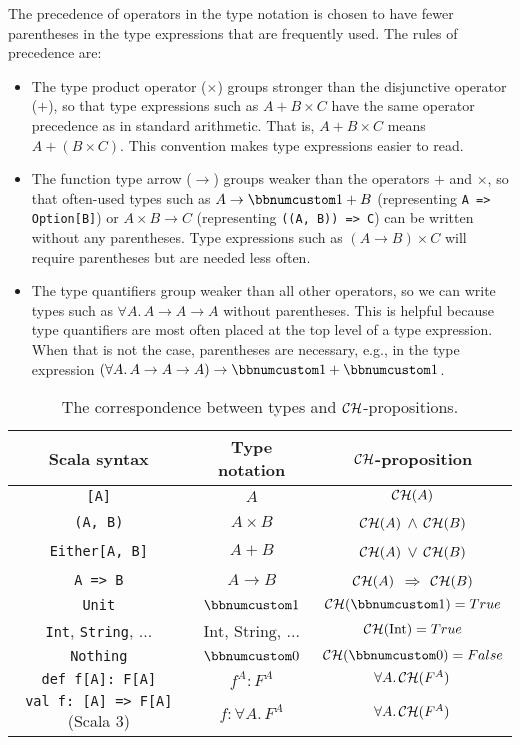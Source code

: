 The precedence of operators
in the type notation is chosen to have fewer parentheses in the type
expressions that are frequently used. The rules of precedence are:
\begin{itemize}
\item The type product operator ($\times$) groups stronger than the disjunctive
operator ($+$), so that type expressions such as $A+B\times C$ have
the same operator precedence as in standard arithmetic. That is, $A+B\times C$
means $A+\left(B\times C\right)$. This convention makes type expressions
easier to read.
\item The function type arrow ($\rightarrow$) groups weaker than the operators
$+$ and $\times$, so that often-used types such as $A\rightarrow\bbnum 1+B$
(representing \lstinline!A => Option[B]!) or $A\times B\rightarrow C$
(representing \lstinline!((A, B)) => C!) can be written without any
parentheses. Type expressions such as $\left(A\rightarrow B\right)\times C$
will require parentheses but are needed less often.
\item The type quantifiers group weaker than all other operators, so we
can write types such as $\forall A.\,A\rightarrow A\rightarrow A$
without parentheses. This is helpful because type quantifiers are
most often placed at the top level of a type expression. When that
is not the case, parentheses are necessary, e.g., in the type expression
$\left(\forall A.\,A\rightarrow A\rightarrow A\right)\rightarrow\bbnum 1+\bbnum 1$.
\end{itemize}
\begin{table}
\begin{centering}
\begin{tabular}{|c|c|c|}
\hline 
\textbf{\small{}Scala syntax} & \textbf{\small{}Type notation} & \textbf{\small{}${\cal CH}$-proposition}\tabularnewline
\hline 
\hline 
\lstinline![A]! & $A$ & ${\cal CH}(A)$\tabularnewline
\hline 
\lstinline!(A, B)! & $A\times B$ & ${\cal CH}(A)$ $\wedge$ ${\cal CH}(B)$\tabularnewline
\hline 
\lstinline!Either[A, B]! & $A+B$ & ${\cal CH}(A)$ $\vee$ ${\cal CH}(B)$\tabularnewline
\hline 
\lstinline!A => B! & $A\rightarrow B$ & ${\cal CH}(A)$ $\Rightarrow$ ${\cal CH}(B)$\tabularnewline
\hline 
\lstinline!Unit! & $\bbnum 1$ & ${\cal CH}(\bbnum 1)=True$\tabularnewline
\hline 
{\small{}}\lstinline!Int!{\small{}, }\lstinline!String!{\small{},
...} & {\small{}$\text{Int}$, $\text{String}$, ...} & ${\cal CH}(\text{Int})=True$\tabularnewline
\hline 
\lstinline!Nothing! & $\bbnum 0$ & ${\cal CH}(\bbnum 0)=False$\tabularnewline
\hline 
\lstinline!def f[A]: F[A]! & $f^{A}:F^{A}$ & $\forall A.\,{\cal CH}(F^{A})$\tabularnewline
\hline 
\lstinline!val f: [A] => F[A]!{\small{} (Scala 3)} & $f:\forall A.\,F^{A}$ & $\forall A.\,{\cal CH}(F^{A})$\tabularnewline
\hline 
\end{tabular}
\par\end{centering}
\caption{The correspondence between types and ${\cal CH}$-propositions.\label{tab:ch-correspondence-type-notation-CH-propositions}}
\end{table}



